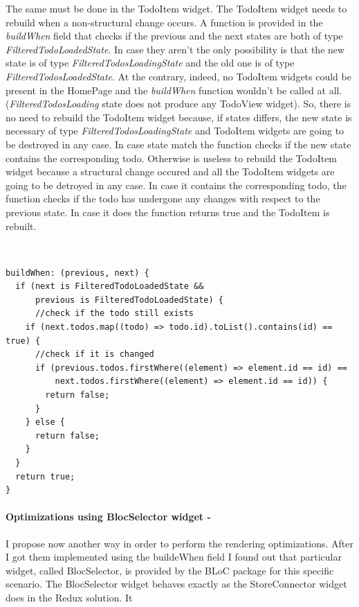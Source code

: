 The same must be done in the TodoItem widget. The TodoItem widget needs to rebuild when a non-structural change occurs. A function is provided in the \textit{buildWhen} field that checks if the previous and the next states are both of type \textit{FilteredTodoLoadedState}. In case they aren’t the only possibility is that the new state is of type \textit{FilteredTodosLoadingState} and the old one is of type \textit{FilteredTodosLoadedState}. At the contrary, indeed, no TodoItem widgets could be present in the HomePage and the \textit{buildWhen }function wouldn't be called at all. (\textit{FilteredTodosLoading} state does not produce any TodoView widget). So, there is no need to rebuild the TodoItem widget because, if states differs, the new state is necessary of type \textit{FilteredTodosLoadingState} and  TodoItem widgets are going to be destroyed in any case. In case state match the function checks if the new state contains the corresponding todo. Otherwise is useless to rebuild the TodoItem widget because a structural change occured and all the TodoItem widgets are going to be detroyed in any case. In case it contains the corresponding todo, the function checks if the todo has undergone any changes with respect to the previous state. In case it does the function returns true and the  TodoItem is rebuilt.
\begin{code}
\mbox{}\\
 \mbox{}
\label{code:2.14}
\begin{verbatim}
buildWhen: (previous, next) {
  if (next is FilteredTodoLoadedState &&
      previous is FilteredTodoLoadedState) {
      //check if the todo still exists
    if (next.todos.map((todo) => todo.id).toList().contains(id) == true) {
      //check if it is changed
      if (previous.todos.firstWhere((element) => element.id == id) ==
          next.todos.firstWhere((element) => element.id == id)) {
        return false;
      }
    } else {
      return false;
    }
  }
  return true;
}
\end{verbatim}
\mbox{}
\end{code}

\paragraph{Optimizations using BlocSelector widget - }\label{subpar:todo_app_bloc_core_state}
I propose now another way in order to perform the rendering optimizations. After I got them implemented  using the buildeWhen field I found out that particular widget, called BlocSelector, is provided by the BLoC package for this specific scenario. The BlocSelector widget behaves exactly as the StoreConnector widget does in the Redux solution. It


